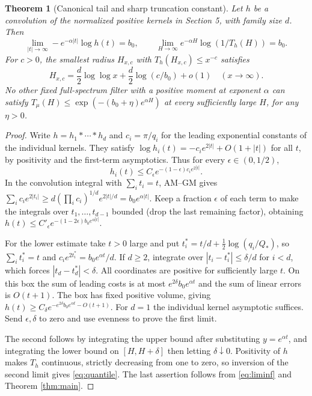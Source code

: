\documentclass[11pt]{article}
\newtheorem{theorem}{Theorem}[section]
\theoremstyle{definition}\newtheorem{definition}[theorem]{Definition}
\theoremstyle{remark}\newtheorem{remark}[theorem]{Remark}
\begin{document}
\begin{theorem}[Canonical tail and sharp truncation constant]\label{thm:tail}
Let $h$ be a convolution of the normalized positive kernels in Section 5, with family size $d$. Then
\begin{equation}\label{eq:tail}
 \lim_{|t|\to\infty}-e^{-\alpha|t|}\log h(t)=b_0,\qquad
 \lim_{H\to\infty}e^{-\alpha H}\log(1/T_h(H))=b_0.
\end{equation}
For $c>0$, the smallest radius $H_{x,c}$ with $T_h(H_{x,c})\le x^{-c}$ satisfies
\begin{equation}\label{eq:quantile}
 H_{x,c}=\frac d2\log\log x+\frac d2\log(c/b_0)+o(1)\quad(x\to\infty).
\end{equation}
No other fixed full-spectrum filter with a positive moment at exponent $\alpha$ can satisfy $T_\mu(H)\le\exp(-(b_0+\eta)e^{\alpha H})$ at every sufficiently large $H$, for any $\eta>0$.
\end{theorem}
\begin{proof}
Write $h=h_1*\cdots*h_d$ and $c_i=\pi/q_i$ for the leading exponential constants of the individual kernels. They satisfy $\log h_i(t)=-c_i e^{2|t|}+O(1+|t|)$ for all $t$, by positivity and the first-term asymptotics. Thus for every $\epsilon\in(0,1/2)$,
\[
 h_i(t)\le C_\epsilon e^{-(1-\epsilon)c_i e^{2|t|}}.
\]
In the convolution integral with $\sum_i t_i=t$, AM--GM gives $\sum_i c_i e^{2|t_i|}\ge d(\prod_i c_i)^{1/d}e^{2|t|/d}=b_0 e^{\alpha|t|}$. Keep a fraction $\epsilon$ of each term to make the integrals over $t_1,\ldots,t_{d-1}$ bounded (drop the last remaining factor), obtaining $h(t)\le C'_{\epsilon}e^{-(1-2\epsilon)b_0 e^{\alpha|t|}}$.

For the lower estimate take $t>0$ large and put $t_i^*=t/d+\frac12\log(q_i/Q_*)$, so $\sum_i t_i^*=t$ and $c_i e^{2t_i^*}=b_0 e^{\alpha t}/d$. If $d\ge2$, integrate over $|t_i-t_i^*|\le\delta/d$ for $i<d$, which forces $|t_d-t_d^*|<\delta$. All coordinates are positive for sufficiently large $t$. On this box the sum of leading costs is at most $e^{2\delta}b_0 e^{\alpha t}$ and the sum of linear errors is $O(t+1)$. The box has fixed positive volume, giving $h(t)\ge C_\delta e^{-e^{2\delta}b_0 e^{\alpha t}-O(t+1)}$. For $d=1$ the individual kernel asymptotic suffices. Send $\epsilon,\delta$ to zero and use evenness to prove the first limit.

The second follows by integrating the upper bound after substituting $y=e^{\alpha t}$, and integrating the lower bound on $[H,H+\delta]$ then letting $\delta\downarrow0$. Positivity of $h$ makes $T_h$ continuous, strictly decreasing from one to zero, so inversion of the second limit gives \eqref{eq:quantile}. The last assertion follows from \eqref{eq:liminf} and Theorem \ref{thm:main}.
\end{proof}
\end{document}
